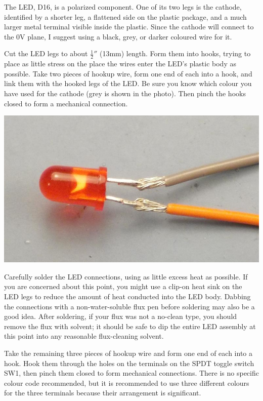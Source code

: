 The LED, D16, is a polarized component.  One of its two legs is the cathode,
identified by a shorter leg, a flattened side on the plastic package, and a
much larger metal terminal visible inside the plastic.  Since the cathode
will connect to the 0V plane, I suggest using a black, grey, or darker
coloured wire for it.

\pagebreak

Cut the LED legs to about $\tfrac{1}{2}''$ (13mm) length.  Form them into
hooks, trying to place as little stress on the place the wires enter the
LED's plastic body as possible.  Take two pieces of hookup wire, form one
end of each into a hook, and link them with the hooked legs of the LED.  Be
sure you know which colour you have used for the cathode (grey is shown in
the photo).  Then pinch the hooks closed to form a mechanical connection.

\nopagebreak
\noindent\includegraphics[width=\linewidth]{led-mechanical.jpg}

Carefully solder the LED connections, using as little excess heat as
possible.  If you are concerned about this point, you might use a clip-on
heat sink on the LED legs to reduce the amount of heat conducted into the
LED body.  Dabbing the connections with a non-water-soluble flux pen before
soldering may also be a good idea.  After soldering, if your flux was not a
no-clean type, you should remove the flux with solvent; it should be safe to
dip the entire LED assembly at this point into any reasonable flux-cleaning
solvent.

Take the remaining three pieces of hookup wire and form one end of each into
a hook.  Hook them through the holes on the terminals on the SPDT toggle
switch SW1, then pinch them closed to form mechanical connections.  There is
no specific colour code recommended, but it is recommended to use three
different colours for the three terminals because their arrangement is
significant.

